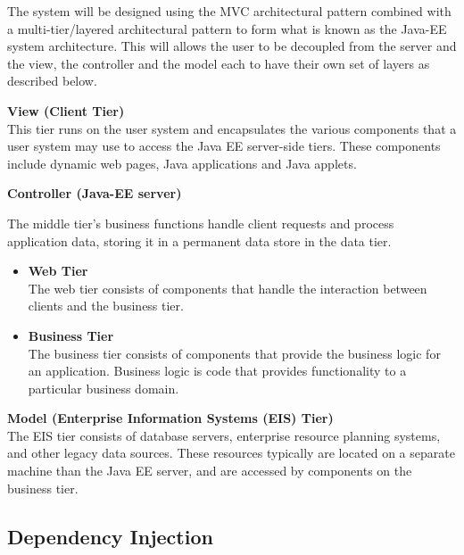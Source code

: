 \begin{flushleft}
The system will be designed using the MVC architectural pattern combined
with a multi-tier/layered architectural pattern to form what is known as the Java-EE system architecture.
This will allows the user to be decoupled from the server and the view, the controller and the model each 
to have their own set of layers as described below.

\textbf{View (Client Tier)}\\
This tier runs on the user system and encapsulates the various components that a user system may use to access the Java EE server-side tiers. These components include dynamic web pages, Java applications and Java applets. 

\textbf{Controller (Java-EE server)}

The middle tier's business functions handle client requests and process application data, storing it in a permanent data store in the data tier.

\begin{itemize}
	\item \textbf{Web Tier}
	\\The web tier consists of components that handle the interaction between clients and the business tier.
	
	\item \textbf{Business Tier}
	\\The business tier consists of components that provide the business logic for an application. Business logic is code that provides functionality to a particular business domain.
\end{itemize}

\textbf{Model (Enterprise Information Systems (EIS) Tier)}\\
The EIS tier consists of database servers, enterprise resource planning systems, and other legacy data sources. These resources typically are located on a separate machine than the Java EE server, and are accessed by components on the business tier.

\end{flushleft}

\subsection*{Dependency Injection}

